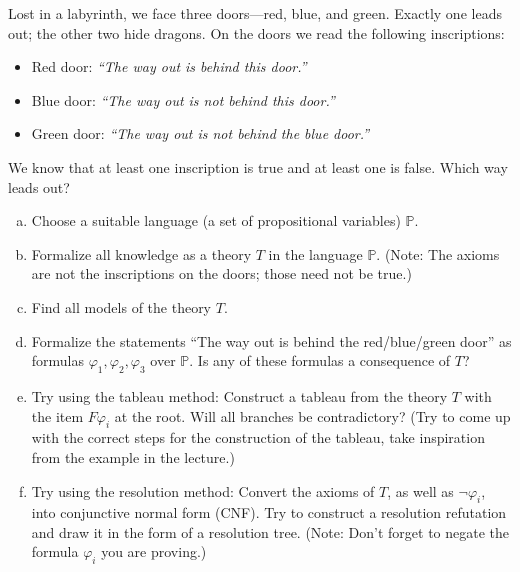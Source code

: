 \begin{problem}\label{problem:dragons}
    
    Lost in a labyrinth, we face three doors---red, blue, and green. Exactly one leads out; the other two hide dragons. On the doors we read the following inscriptions:
    \begin{itemize}
        \item Red door: {\it ``The way out is behind this door.''}
        \item Blue door: {\it ``The way out is not behind this door.''}
        \item Green door: {\it ``The way out is not behind the blue door.''}
    \end{itemize}
    We know that at least one inscription is true and at least one is false. Which way leads out?
    \begin{enumerate}[(a)]
        \item Choose a suitable language (a set of propositional variables) $\mathbb P$.
        \item Formalize all knowledge as a theory $T$ in the language $\mathbb P$. (Note: The axioms are not the inscriptions on the doors; those need not be true.)
        \item Find all models of the theory $T$.
        \item Formalize the statements ``The way out is behind the red/blue/green door'' as formulas $\varphi_1,\varphi_2,\varphi_3$ over $\mathbb P$. Is any of these formulas a consequence of $T$?
        \item Try using the tableau method: Construct a tableau from the theory $T$ with the item $F\varphi_i$ at the root. Will all branches be contradictory? (Try to come up with the correct steps for the construction of the tableau, take inspiration from the example in the lecture.)
        \item Try using the resolution method: Convert the axioms of $T$, as well as $\neg\varphi_i$, into conjunctive normal form (CNF). Try to construct a resolution refutation and draw it in the form of a resolution tree. (Note: Don’t forget to negate the formula $\varphi_i$ you are proving.)
    \end{enumerate}  


\end{problem}

